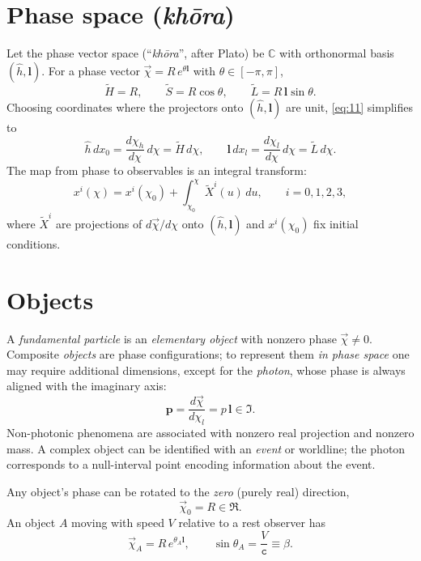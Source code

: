 \documentclass[11pt]{article}
\numberwithin{equation}{section}
\begin{document}
\section{Phase space (\textit{kh\={o}ra})}
Let the phase vector space (``\emph{kh\={o}ra}'', after Plato) be $\mathbb{C}$ with orthonormal basis $(\hat{h},\mathbf{l})$. For a phase vector $\vec{\chi}=R\,e^{\theta\mathbf{l}}$ with $\theta\in[-\pi,\pi]$,
\begin{equation}
\tilde{H}=R,\qquad \tilde{S}=R\cos\theta,\qquad \tilde{L}=R\,\mathbf{l}\sin\theta.
\label{eq:21}
\end{equation}
Choosing coordinates where the projectors onto $(\hat{h},\mathbf{l})$ are unit, \eqref{eq:11} simplifies to
\begin{equation}
\hat{h}\,dx_0=\frac{d\chi_h}{d\chi}\,d\chi=\tilde{H}\,d\chi,\qquad
\mathbf{l}\,dx_l=\frac{d\chi_l}{d\chi}\,d\chi=\tilde{L}\,d\chi.
\label{eq:22}
\end{equation}
The map from phase to observables is an integral transform:
\begin{equation}
x^i(\chi)=x^i(\chi_0)+\int_{\chi_0}^{\chi}\tilde{X}^i(u)\,du,\qquad i=0,1,2,3,
\label{eq:23}
\end{equation}
where $\tilde{X}^i$ are projections of $d\vec{\chi}/d\chi$ onto $(\hat{h},\mathbf{l})$ and $x^i(\chi_0)$ fix initial conditions.

\section{Objects}
A \emph{fundamental particle} is an \emph{elementary object} with nonzero phase $\vec{\chi}\neq0$. Composite \emph{objects} are phase configurations; to represent them \emph{in phase space} one may require additional dimensions, except for the \emph{photon}, whose phase is always aligned with the imaginary axis:
\begin{equation}
\mathbf{p}=\frac{d\vec{\chi}}{d\chi_l}=p\,\mathbf{l}\in\Im.
\label{eq:31}
\end{equation}
Non-photonic phenomena are associated with nonzero real projection and nonzero mass. A complex object can be identified with an \emph{event} or worldline; the photon corresponds to a null-interval point encoding information about the event.

Any object's phase can be rotated to the \emph{zero} (purely real) direction,
\begin{equation}
\vec{\chi}_0=R\in\Re.
\label{eq:32}
\end{equation}
An object $A$ moving with speed $V$ relative to a rest observer has
\begin{equation}
\vec{\chi}_A=R\,e^{\theta_A\mathbf{l}},\qquad
\sin\theta_A=\frac{V}{\mathtt{c}}\equiv\beta.
\label{eq:33}
\end{equation}
\end{document}
